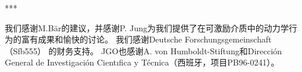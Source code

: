 \documentclass[
    bachelor,
    nofont, %
    pdflinks,
    ]{xjtuthesis}
\begin{document}
\bigskip
\begin{center}
***
\end{center}

我们感谢M.Bär的建议，并感谢P. Jung为我们提供了在可激励介质中的动力学行为的富有成果和愉快的讨论。 我们感谢Deutsche Forschungsgemeinschaft（Sfb555）
的财务⽀持。 JGO也感谢A. von Humboldt-Stiftung和Dirección
General de Investigación Cientıfica y Técnica（西班⽛，项⽬PB96-0241）。

    \xjtuendappendix
	

\end{document}

